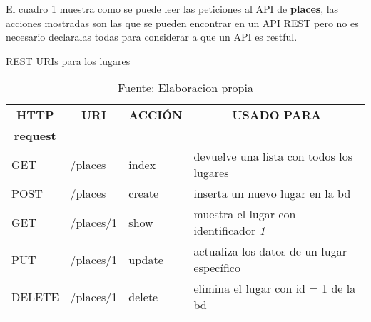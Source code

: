 


   El cuadro \ref{tab:rest} muestra como se puede leer las peticiones al API de \textbf{places}, las acciones mostradas son las que se pueden encontrar en un API REST pero no es necesario declaralas todas para considerar a que un API es restful.\\


   \begin{table}[!hbp]
     \begin{center}
       \caption[recursos REST]{REST URIs para los lugares}
       \label{tab:rest}

       \begin{tabularx}{0.75\textwidth}{ l l l  X }
         \toprule
         \multicolumn{1}{c}{\textbf{HTTP}} &
         \multicolumn{1}{c}{\textbf{URI}}  &
         \multicolumn{1}{c}{\textbf{ACCI\'ON}} &
         \multicolumn{1}{c}{\textbf{USADO PARA}}  \\
         \multicolumn{1}{c}{\textbf{request}} & & & \\

         \midrule
         GET     &  /places    &  index    & devuelve una lista con todos los lugares\\
         POST    &  /places    &  create   & inserta un nuevo lugar en la bd\\
         GET     &  /places/1  &  show     & muestra el lugar con identificador \emph{1}\\
         PUT     &  /places/1  &  update   & actualiza los datos de un lugar específico\\
         DELETE  &  /places/1  &  delete   & elimina el lugar con id = 1 de la bd\\
         \bottomrule
       \end{tabularx}

       \caption*{Fuente: Elaboracion propia}
     \end{center}
   \end{table}

